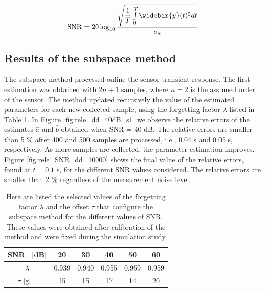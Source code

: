 {{\begin{equation} \mathrm{SNR} = 20 \log_{10}{\dfrac{ \sqrt{ \dfrac{1}{T}\int\limits_0^T{\widebar{y}(t)^2 d t} } } { \sigma_{\bm{\epsilon}}}} \end{equation}  


\subsection{Results of the subspace method}

The subspace method processed online the sensor transient response.
The first estimation was obtained with $2n+1$ samples, where $n=2$ is the assumed order of the sensor.
The method updated recursively the value of the estimated parameters for each new collected sample, using the forgetting factor $\lambda$ listed in Table \ref{table:lambdas}.
In Figure \ref{fig:rele_dd_40dB_s1} we observe the relative errors of the estimates $\widehat{a}$ and $\widehat{b}$ obtained when SNR = 40 dB. 
The relative errors are smaller than 5 \% after 400 and 500 samples are processed, i.e., 0.04 s and 0.05 s, respectively.
As more samples are collected, the parameter estimation improves.
Figure \ref{fig:rele_SNR_dd_10000} shows the final value of the relative errors, found at $t=0.1$ s, for the different SNR values considered.
The relative errors are smaller than 2 \% regardless of the measurement noise level.

\begin{table}[h!]
\centering
\caption{Here are listed the selected values of the forgetting factor $\lambda$ and the offset $\tau$ that configure the subspace method for the different values of SNR. These values were obtained after calibration of the method and were fixed during the simulation study.}
\begin{tabular}{c| c c c c c} 
 \hline
 SNR \ [dB] & 20 & 30 & 40 & 50 & 60 \\ [0.5ex] 
 \hline
 $\lambda$ & 0.939 & 0.940 & 0.955 & 0.959 & 0.959 \\ %
 $\tau$ [g] \  & 15 & 15 & 17 & 14 & 20 \\ [0.5ex] %
 \hline
\end{tabular}
\label{table:lambdas}
\end{table}


}}
